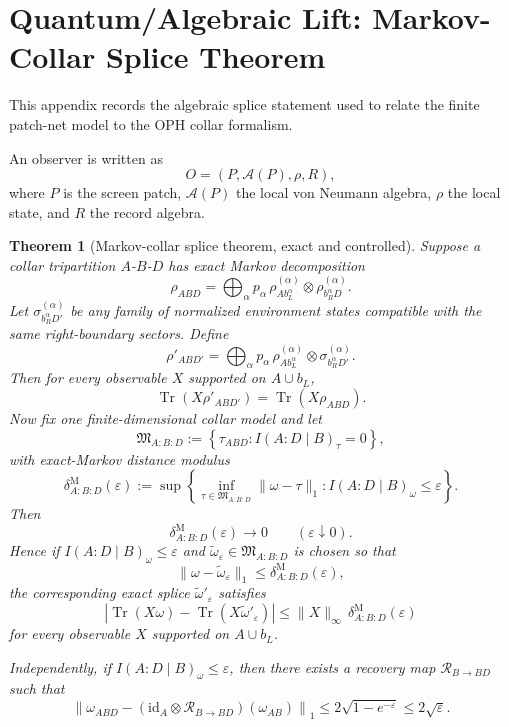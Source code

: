 \documentclass[11pt]{article}
\newtheorem{theorem}{Theorem}[section]
\theoremstyle{remark}
\theoremstyle{plain}
\begin{document}
\appendix
\section{Quantum/Algebraic Lift: Markov-Collar Splice Theorem}\label{app:splice}

This appendix records the algebraic splice statement used to relate the finite patch-net model to
the OPH collar formalism.

An observer is written as
\[
O=(P,\mathcal{A}(P),\rho,R),
\]
where $P$ is the screen patch, $\mathcal{A}(P)$ the local von Neumann algebra, $\rho$ the local state, and $R$ the record algebra.

\begin{theorem}[Markov-collar splice theorem, exact and controlled]\label{thm:splice}
Suppose a collar tripartition $A$-$B$-$D$ has exact Markov decomposition
\[
\rho_{ABD}
=
\bigoplus_{\alpha}
p_\alpha\,
\rho^{(\alpha)}_{A b_L^\alpha}
\otimes
\rho^{(\alpha)}_{b_R^\alpha D}.
\]
Let $\sigma_{b_R^\alpha D'}^{(\alpha)}$ be any family of normalized environment states compatible with the same right-boundary sectors. Define
\[
\rho'_{AB D'}
=
\bigoplus_{\alpha}
p_\alpha\,
\rho^{(\alpha)}_{A b_L^\alpha}
\otimes
\sigma_{b_R^\alpha D'}^{(\alpha)}.
\]
Then for every observable $X$ supported on $A\cup b_L$,
\[
\operatorname{Tr}(X\rho'_{AB D'})
=
\operatorname{Tr}(X\rho_{ABD}).
\]
Now fix one finite-dimensional collar model and let
\[
\mathfrak M_{A:B:D}
:=
\left\{
\tau_{ABD}: I(A:D\mid B)_\tau=0
\right\},
\]
with exact-Markov distance modulus
\[
\delta^{\mathrm M}_{A:B:D}(\varepsilon)
:=
\sup\left\{
\inf_{\tau\in\mathfrak M_{A:B:D}}\|\omega-\tau\|_1:
I(A:D\mid B)_\omega\le\varepsilon
\right\}.
\]
Then
\[
\delta^{\mathrm M}_{A:B:D}(\varepsilon)\to0
\qquad
(\varepsilon\downarrow0).
\]
Hence if \(I(A:D\mid B)_\omega\le \varepsilon\) and \(\widetilde\omega_\varepsilon\in\mathfrak M_{A:B:D}\) is chosen so that
\[
\|\omega-\widetilde\omega_\varepsilon\|_1
\le
\delta^{\mathrm M}_{A:B:D}(\varepsilon),
\]
the corresponding exact splice \(\widetilde\omega'_\varepsilon\) satisfies
\[
\left|
\operatorname{Tr}(X\omega)-\operatorname{Tr}(X\widetilde\omega'_\varepsilon)
\right|
\le
\|X\|_\infty\,
\delta^{\mathrm M}_{A:B:D}(\varepsilon)
\]
for every observable \(X\) supported on \(A\cup b_L\).

Independently, if \(I(A:D\mid B)_\omega\le \varepsilon\), then there exists a recovery map \(\mathcal R_{B\to BD}\) such that
\[
\left\|
\omega_{ABD}
-
(\mathrm{id}_A\otimes \mathcal R_{B\to BD})(\omega_{AB})
\right\|_1
\le
2\sqrt{1-e^{-\varepsilon}}
\le
2\sqrt{\varepsilon}.
\]
\end{theorem}
\end{document}
